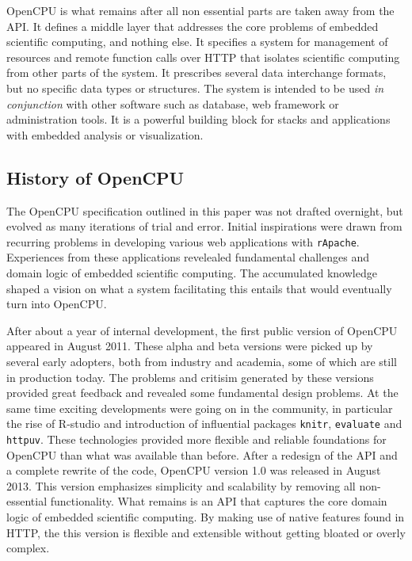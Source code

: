 OpenCPU is what remains after all non essential parts are taken away from the API. It defines a middle layer that addresses the core problems of embedded scientific computing, and nothing else. It specifies a system for management of resources and remote function calls over HTTP that isolates scientific computing from other parts of the system. It prescribes several data interchange formats, but no specific data types or structures. The system is intended to be used \emph{in conjunction} with other software such as database, web framework or administration tools. It is a powerful building block for stacks and applications with embedded analysis or visualization. 

\subsection{History of OpenCPU}

The OpenCPU specification outlined in this paper was not drafted overnight, but evolved as many iterations of trial and error. Initial inspirations were drawn from recurring problems in developing various \R web applications with \texttt{rApache}. Experiences from these applications revelealed fundamental challenges and domain logic of embedded scientific computing. The accumulated knowledge shaped a vision on what a system facilitating this entails that would eventually turn into OpenCPU.

After about a year of internal development, the first public version of OpenCPU appeared in August 2011. These alpha and beta versions were picked up by several early adopters, both from industry and academia, some of which are still in production today. The problems and critisim generated by these versions provided great feedback and revealed some fundamental design problems. At the same time exciting developments were going on in the \R community, in particular the rise of R-studio and introduction of influential \R packages \texttt{knitr}, \texttt{evaluate} and \texttt{httpuv}. These technologies provided more flexible and reliable foundations for OpenCPU than what was available than before. After a redesign of the API and a complete rewrite of the code, OpenCPU version  1.0 was released in August 2013. This version emphasizes simplicity and scalability by removing all non-essential functionality. What remains is an API that captures the core domain logic of embedded scientific computing. By making use of native features found in HTTP, the this version is flexible and extensible without getting bloated or overly complex.


